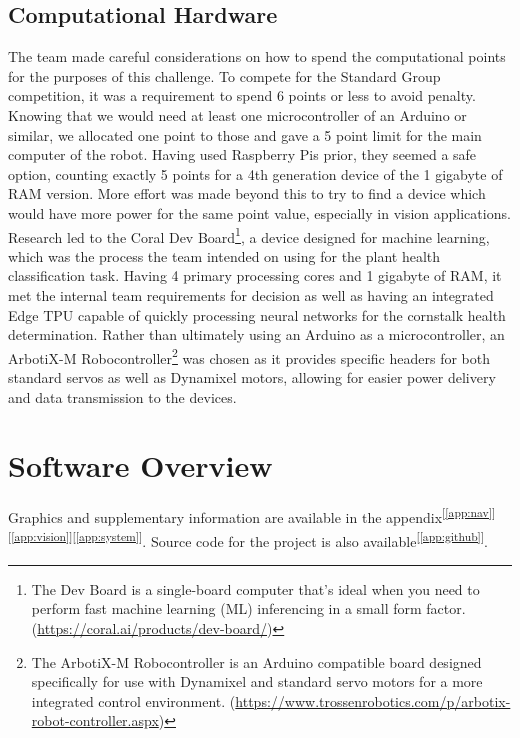 \documentclass[11pt, hidelinks]{report}
\newcommand{\refapp}[1]{\textsuperscript{[\ref{#1}]}}
\begin{document}
\subsection{Computational Hardware}
The team made careful considerations on how to spend the computational points for the purposes of this challenge. To compete for the Standard Group competition, it was a requirement to spend 6 points or less to avoid penalty. Knowing that we would need at least one microcontroller of an Arduino or similar, we allocated one point to those and gave a 5 point limit for the main computer of the robot. Having used Raspberry Pis prior, they seemed a safe option, counting exactly 5 points for a 4th generation device of the 1 gigabyte of RAM version. More effort was made beyond this to try to find a device which would have more power for the same point value, especially in vision applications. Research led to the Coral Dev Board\footnote{The Dev Board is a single-board computer that's ideal when you need to perform fast machine learning (ML) inferencing in a small form factor. (\url{https://coral.ai/products/dev-board/})}, a device designed for machine learning, which was the process the team intended on using for the plant health classification task. Having 4 primary processing cores and 1 gigabyte of RAM, it met the internal team requirements for decision as well as having an integrated Edge TPU capable of quickly processing neural networks for the cornstalk health determination. Rather than ultimately using an Arduino as a microcontroller, an ArbotiX-M Robocontroller\footnote{The ArbotiX-M Robocontroller is an Arduino compatible board designed specifically for use with Dynamixel and standard servo motors for a more integrated control environment. (\url{https://www.trossenrobotics.com/p/arbotix-robot-controller.aspx})} was chosen as it provides specific headers for both standard servos as well as Dynamixel motors, allowing for easier power delivery and data transmission to the devices. 

\section{Software Overview}
Graphics and supplementary information are available in the appendix\refapp{app:nav}\refapp{app:vision}\refapp{app:system}. Source code for the project is also available\refapp{app:github}.
\end{document}
